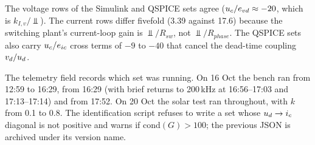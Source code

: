 The voltage rows of the Simulink and QSPICE sets agree ($u_{c}/e_{vd} \approx -20$, which is $k_{I,v}/\Vbar$). The current rows differ fivefold (3.39 against 17.6) because the switching plant's current-loop gain is $\Vbar/R_{sw}$, not $\Vbar/R_{phase}$. The QSPICE sets also carry $u_{c}/e_{ic}$ cross terms of $-9$ to $-40$ that cancel the dead-time coupling $v_{d}/u_{d}$.

The telemetry field  records which set was running. On 16 Oct the bench ran  from 12:59 to 16:29,  from 16:29 (with brief returns to 200\,kHz at 16:56--17:03 and 17:13--17:14) and  from 17:52. On 20 Oct the solar test ran  throughout, with $k$ from 0.1 to 0.8. The identification script refuses to write a set whose $u_{d}\rightarrow i_{c}$ diagonal is not positive and warns if cond$(G) > 100$; the previous JSON is archived under its version name.
